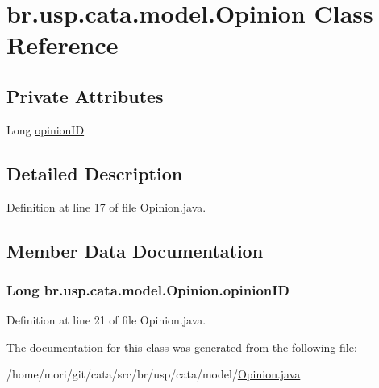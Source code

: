 \hypertarget{classbr_1_1usp_1_1cata_1_1model_1_1_opinion}{\section{br.\+usp.\+cata.\+model.\+Opinion Class Reference}
\label{classbr_1_1usp_1_1cata_1_1model_1_1_opinion}
}
\subsection*{Private Attributes}
\begin{DoxyCompactItemize}
\item 
Long \hyperlink{classbr_1_1usp_1_1cata_1_1model_1_1_opinion_a24a96456b2b59affe82297ebbbbdeddb}{opinion\+I\+D}
\end{DoxyCompactItemize}


\subsection{Detailed Description}


Definition at line 17 of file Opinion.\+java.



\subsection{Member Data Documentation}
\hypertarget{classbr_1_1usp_1_1cata_1_1model_1_1_opinion_a24a96456b2b59affe82297ebbbbdeddb}{
\subsubsection[{opinion\+I\+D}]{\setlength{\rightskip}{0pt plus 5cm}Long br.\+usp.\+cata.\+model.\+Opinion.\+opinion\+I\+D\hspace{0.3cm}{\ttfamily [private]}}}\label{classbr_1_1usp_1_1cata_1_1model_1_1_opinion_a24a96456b2b59affe82297ebbbbdeddb}


Definition at line 21 of file Opinion.\+java.



The documentation for this class was generated from the following file\+:\begin{DoxyCompactItemize}
\item 
/home/mori/git/cata/src/br/usp/cata/model/\hyperlink{_opinion_8java}{Opinion.\+java}\end{DoxyCompactItemize}

